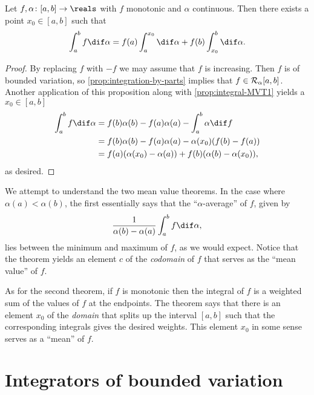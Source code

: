 \documentclass[article, a4paper, 11pt, oneside]{memoir}
\numberwithin{equation}{chapter}
\begin{document}
\begin{proposition}
    \label{prop:integral-MVT2}
    Let $f,\alpha \colon [a,b] \to \reals$ with $f$ monotonic and $\alpha$ continuous. Then there exists a point $x_0 \in [a,b]$ such that
    \begin{equation*}
        \int_a^b f \dif\alpha
            = f(a) \int_a^{x_0} \dif\alpha + f(b) \int_{x_0}^b \dif\alpha.
    \end{equation*}
\end{proposition}

\begin{proof}
    By replacing $f$ with $-f$ we may assume that $f$ is increasing. Then $f$ is of bounded variation, so \cref{prop:integration-by-parts} implies that $f \in \integrable[\alpha]{a,b}$. Another application of this proposition along with \cref{prop:integral-MVT1} yields a $x_0 \in [a,b]$
    \begin{align*}
        \int_a^b f \dif\alpha
            &= f(b)\alpha(b) - f(a)\alpha(a) - \int_a^b \alpha \dif f \\
            &= f(b)\alpha(b) - f(a)\alpha(a) - \alpha(x_0)(f(b) - f(a)) \\
            &= f(a) (\alpha(x_0) - \alpha(a)) + f(b)(\alpha(b) - \alpha(x_0)),
    \end{align*}
    as desired.
\end{proof}


We attempt to understand the two mean value theorems. In the case where $\alpha(a) < \alpha(b)$, the first essentially says that the \enquote{$\alpha$-average} of $f$, given by
%
\begin{equation*}
    \frac{1}{\alpha(b) - \alpha(a)} \int_a^b f \dif\alpha,
\end{equation*}
%
lies between the minimum and maximum of $f$, as we would expect. Notice that the theorem yields an element $c$ of the \emph{codomain} of $f$ that serves as the \enquote{mean value} of $f$.

As for the second theorem, if $f$ is monotonic then the integral of $f$ is a weighted sum of the values of $f$ at the endpoints. The theorem says that there is an element $x_0$ of the \emph{domain} that splits up the interval $[a,b]$ such that the corresponding integrals gives the desired weights. This element $x_0$ in some sense serves as a \enquote{mean} of $f$.


\section{Integrators of bounded variation}
\end{document}
